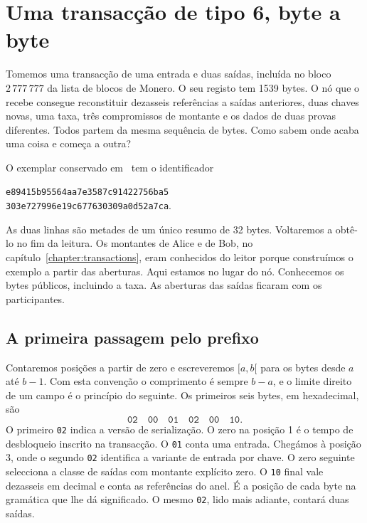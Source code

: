 \chapter{Uma transacção de tipo 6, byte a byte}
\label{appendix:pagamento-tipo-seis}

Tomemos uma transacção de uma entrada e duas saídas, incluída no bloco
\(2\,777\,777\) da lista de blocos de Monero. O seu registo tem 1539
bytes. O nó que o recebe consegue reconstituir dezasseis referências
a saídas anteriores, duas chaves novas, uma taxa, três compromissos de
montante e os dados de duas provas diferentes. Todos partem da mesma
sequência de bytes. Como sabem onde acaba uma coisa e começa a outra?

O exemplar conservado em~\cite{monero-transaccao-tipo-seis} tem o identificador
\begin{center}
\texttt{e89415b95564aa7e3587c91422756ba5}\\
\texttt{303e727996e19c677630309a0d52a7ca}.
\end{center}
As duas linhas são metades de um único resumo de 32 bytes. Voltaremos
a obtê-lo no fim da leitura. Os montantes de Alice e de Bob, no
capítulo~\ref{chapter:transactions}, eram conhecidos do leitor porque
construímos o exemplo a partir das aberturas. Aqui estamos no lugar do nó.
Conhecemos os bytes públicos, incluindo a taxa. As aberturas das saídas
ficaram com os participantes.

\section{A primeira passagem pelo prefixo}

Contaremos posições a partir de zero e escreveremos \([a,b[\) para os
bytes desde \(a\) até \(b-1\). Com esta convenção o comprimento é sempre
\(b-a\), e o limite direito de um campo é o princípio do seguinte. Os
primeiros seis bytes, em hexadecimal, são
\[
                  \mathtt{02\quad00\quad01\quad02\quad00\quad10}.
\]
O primeiro \texttt{02} indica a versão de serialização. O zero na
posição 1 é o tempo de desbloqueio inscrito na transacção. O
\texttt{01} conta uma entrada. Chegámos à posição 3, onde o segundo
\texttt{02} identifica a variante de entrada por chave. O zero
seguinte selecciona a classe de saídas com montante explícito zero.
O \texttt{10} final vale dezasseis em decimal e conta as referências
do anel. É a posição de cada byte na gramática que lhe dá significado.
O mesmo \texttt{02}, lido mais adiante, contará duas saídas.

